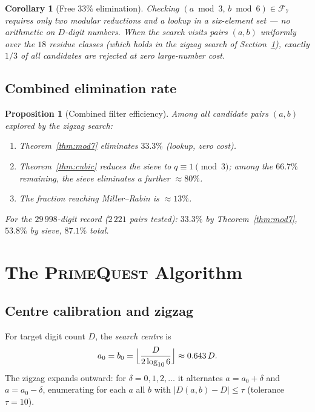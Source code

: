 \documentclass[11pt,a4paper]{article}
\newtheorem{proposition}[theorem]{Proposition}
\newtheorem{corollary}[theorem]{Corollary}
\theoremstyle{definition}
\theoremstyle{remark}
\newcommand{\F}{\mathcal{F}}
\begin{document}
\begin{corollary}[Free $33\%$ elimination]\label{cor:t2-free}
Checking $(a\bmod 3,\,b\bmod 6)\in\F_7$ requires only two modular
reductions and a lookup in a six-element set — no arithmetic on
$D$-digit numbers. When the search visits pairs $(a,b)$ uniformly over
the $18$ residue classes (which holds in the zigzag search of
Section~\ref{sec:algo}), exactly $1/3$ of all candidates are rejected
at zero large-number cost.
\end{corollary}

\subsection{Combined elimination rate}

\begin{proposition}[Combined filter efficiency]\label{prop:combined}
Among all candidate pairs $(a,b)$ explored by the zigzag search:
\begin{enumerate}[label=(\roman*)]
\item Theorem~\ref{thm:mod7} eliminates $33.3\%$ (lookup, zero cost).
\item Theorem~\ref{thm:cubic} reduces the sieve to $q\equiv 1\pmod{3}$;
  among the $66.7\%$ remaining, the sieve eliminates a further $\approx
  80\%$.
\item The fraction reaching Miller--Rabin is $\approx 13\%$.
\end{enumerate}
For the $29\,998$-digit record ($2\,221$ pairs tested):
$33.3\%$ by Theorem~\ref{thm:mod7},
$53.8\%$ by sieve,
$\mathbf{87.1\%}$ total.
\end{proposition}

\section{The \textsc{PrimeQuest} Algorithm}\label{sec:algo}

\subsection{Centre calibration and zigzag}

For target digit count $D$, the \emph{search centre} is
\[
  a_0 = b_0 = \Bigl\lfloor\frac{D}{2\log_{10}6}\Bigr\rfloor \approx 0.643\,D.
\]
The zigzag expands outward: for $\delta = 0, 1, 2, \ldots$ it alternates
$a = a_0+\delta$ and $a = a_0-\delta$, enumerating for each $a$ all $b$
with $|D(a,b)-D|\leq\tau$ (tolerance $\tau=10$).
\end{document}
